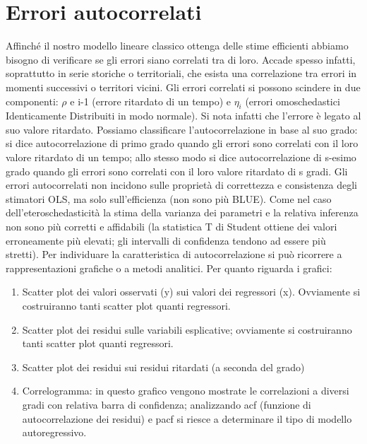 \documentclass[a4page, 11pt]{article}
\begin{document}
\section{Errori autocorrelati}

Affinché il nostro modello lineare classico ottenga delle stime efficienti abbiamo bisogno di verificare se gli errori siano correlati tra di loro.
\newline
Accade spesso infatti, soprattutto in serie storiche o territoriali, che esista una correlazione tra errori in momenti successivi o territori vicini.
\newline
Gli errori correlati si possono scindere in due componenti: $\rho$ e i-1 (errore ritardato di un tempo) e $\eta_i$ (errori omoschedastici Identicamente Distribuiti in modo normale). Si nota infatti che l’errore è legato al suo valore ritardato.
\newline
Possiamo classificare l’autocorrelazione in base al suo grado: si dice autocorrelazione di primo grado quando gli errori sono correlati con il loro valore ritardato di un tempo; allo stesso modo si dice autocorrelazione di s-esimo grado quando gli errori sono correlati con il loro valore ritardato di s gradi. Gli errori autocorrelati non incidono sulle proprietà di correttezza e consistenza degli stimatori OLS, ma solo sull’efficienza (non sono più BLUE). Come nel caso dell’eteroschedasticità la stima della varianza dei parametri e la relativa inferenza non sono più corretti e affidabili (la statistica T di Student ottiene dei valori erroneamente più elevati; gli intervalli di confidenza tendono ad essere più stretti).
Per individuare la caratteristica di autocorrelazione si può ricorrere a rappresentazioni grafiche o a metodi analitici.
\newline
\newline
Per quanto riguarda i grafici:
\begin{enumerate}[noitemsep]
\item Scatter plot dei valori osservati (y) sui valori dei regressori (x). Ovviamente si costruiranno tanti scatter plot quanti regressori.
\item Scatter plot dei residui sulle variabili esplicative; ovviamente si costruiranno tanti scatter plot quanti regressori.
\item Scatter plot dei residui sui residui ritardati (a seconda del grado)
\item Correlogramma: in questo grafico vengono mostrate le correlazioni a diversi gradi con relativa barra di confidenza; analizzando acf (funzione di autocorrelazione dei residui) e pacf si riesce a determinare il tipo di modello autoregressivo.
\end{enumerate}
\end{document}
